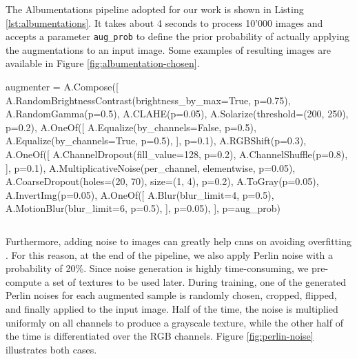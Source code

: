 \medskip

The Albumentations pipeline adopted for our work is shown in Listing \ref{lst:albumentations}. It takes about 4 seconds to process 10'000 images and accepts a parameter \texttt{aug\_prob} to define the prior probability of actually applying the augmentations to an input image. Some examples of resulting images are available in Figure \ref{fig:albumentation-chosen}.

\vspace{0.1cm}
\begin{python}
augmenter = A.Compose([
	A.RandomBrightnessContrast(brightness_by_max=True, p=0.75),
	A.RandomGamma(p=0.5),
	A.CLAHE(p=0.05),
	A.Solarize(threshold=(200, 250), p=0.2),
	A.OneOf([
		A.Equalize(by_channels=False, p=0.5),
		A.Equalize(by_channels=True, p=0.5),
	], p=0.1),
	A.RGBShift(p=0.3),
	A.OneOf([
		A.ChannelDropout(fill_value=128, p=0.2),
		A.ChannelShuffle(p=0.8),
	], p=0.1),
	A.MultiplicativeNoise(per_channel, elementwise, p=0.05),
	A.CoarseDropout(holes=(20, 70), size=(1, 4), p=0.2),
	A.ToGray(p=0.05),
	A.InvertImg(p=0.05),
	A.OneOf([
		A.Blur(blur_limit=4, p=0.5),
		A.MotionBlur(blur_limit=6, p=0.5),
	], p=0.05),
], p=aug_prob)
\end{python}
\vspace{-0.5cm}
\begin{lstlisting}[frame=none,caption={Chosen Albumentations pipeline}, 
label=lst:albumentations]
\end{lstlisting}

Furthermore, adding noise to images can greatly help \gls{cnn}s on avoiding overfitting \cite{shorten2019augmentationsurvey}. For this reason, at the end of the pipeline, we also apply Perlin noise \cite{perlin-noise} with a probability of 20\%. Since noise generation is highly time-consuming, we pre-compute a set of textures to be used later. During training, one of the generated Perlin noises for each augmented sample is randomly chosen, cropped, flipped, and finally applied to the input image. Half of the time, the noise is multiplied uniformly on all channels to produce a grayscale texture, while the other half of the time is differentiated over the RGB channels. Figure \ref{fig:perlin-noise} illustrates both cases.

